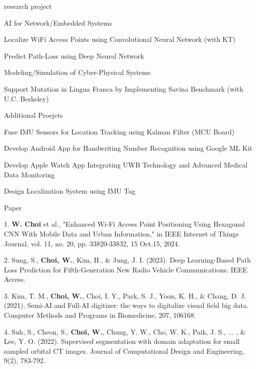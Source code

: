 \documentclass[
	11pt, %
]{resume} %
\begin{document}
\begin{rSection}{research project}
	\begin{rSubsection}{AI for Network/Embedded Systems}{}{}{}
		\item Localize WiFi Access Points using Convolutional Neural Network (with KT)
		\item Predict Path-Loss using Deep Neural Network
	
	\end{rSubsection}

	\begin{rSubsection}{Modeling/Simulation of Cyber-Physical Systems}{}{}{}
		\item Support Mutation in Lingua Franca by Implementing Savina Benchmark (with U.C. Berkeley)
	\end{rSubsection}

	
	\begin{rSubsection}{Additional Proejcts}{}{}{}
		\item Fuse IMU Sensors for Location Tracking using Kalman Filter (MCU Board)
		\item Develop Android App for Handwriting Number Recognition using Google ML Kit
		\item Develop Apple Watch App Integrating UWB Technology and Advanced Medical Data Monitoring
		\item Design Localization System using IMU Tag
	\end{rSubsection}
\end{rSection}



\begin{rSection}{Paper}

	1. \textbf{W. Choi} et al., "Enhanced Wi-Fi Access Point Positioning Using Hexagonal CNN With Mobile Data and Urban Information," in IEEE Internet of Things Journal, vol. 11, no. 20, pp. 33820-33832, 15 Oct.15, 2024.

	2. Sung, S., \textbf{Choi, W.}, Kim, H., \& Jung, J. I. (2023). Deep Learning-Based Path Loss Prediction for Fifth-Generation New Radio Vehicle Communications. IEEE Access.
	
	3. Kim, T. M., \textbf{Choi, W.}, Choi, I. Y., Park, S. J., Yoon, K. H., \& Chang, D. J. (2021). Semi-AI and Full-AI digitizer: the ways to digitalize visual field big data. Computer Methods and Programs in Biomedicine, 207, 106168.

	4. Suh, S., Cheon, S., \textbf{Choi, W.}, Chung, Y. W., Cho, W. K., Paik, J. S., ... , \& Lee, Y. O. (2022). Supervised segmentation with domain adaptation for small sampled orbital CT images. Journal of Computational Design and Engineering, 9(2), 783-792.


\end{rSection}
\end{document}
